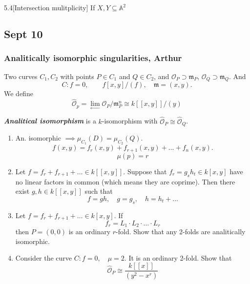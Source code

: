\begin{manualexercise}{5.4}[Intersection mulitplicity]
	If $X,Y\subseteq \mathbb{A}^{2} $
\end{manualexercise}

\subsection{Sept 10}

\subsubsection{Analitically isomorphic singularities, Arthur}
Two curves $C_1,C_2$ with points $P \in C_1$ and $Q\in C_2$, and $\mathcal{O}_P\supset\mathfrak{m}_P$, $\mathcal{O}_Q\supset\mathfrak{m}_Q$. And
\[C:f=0,\qquad f[x,y]/(f), \quad \mathfrak{m}=(x,y).\]
We define
\[\hat{\mathcal{O}}_p=\lim_{\longleftarrow} \mathcal{O}_P/\mathfrak{m}^n_P\cong k[ [x,y]]/(y)\]

\begin{defn}
	\textit{\textbf{Analitical isomorphism}} is a $k$-isomorphism with $\hat{\mathcal{O}}_P\cong \hat{\mathcal{O}}_Q$.
\end{defn}

\begin{manualexercise}{}
	\begin{enumerate}[label=\alph*.]
		\item An. isomorphic $\implies \mu_{C_1}(D)=\mu_{C_2}(Q)$.
\[f(x,y)=f_r(x,y)+f_{r+1}(x,y)+\ldots+f_n(x,y).\]
\[\mu(p)=r\]

\item Let $f=f_r+f_{r+1}+\ldots\in k[[x,y]]$. Suppose that $f_r=g_s h_t\in k[x,y]$ have no linear factors in common (which means they are coprime). Then there exist $g,h\in k[ [ x,y] ]$ such that
	\[f=gh,\quad g=g_s,\quad h=h_t+\ldots\]

	\item Let $f=f_r+f_{r+1}+\ldots\in k[x,y]$. If
		\[f_r=L_1\cdot L_2\cdot \ldots\cdot L_r\]
		then $P=(0,0)$ is an ordinary $r$-fold. Show that any 2-folds are analitically isomorphic.

		\item Consider the curve $C:f=0,\quad \mu=2$. It is an ordinary 2-fold. Show that
			\[\hat{\mathcal{O}}_P\cong \frac{k[ [ x] ]}{(y^2-x^r)}\]
	\end{enumerate}
\end{manualexercise}

